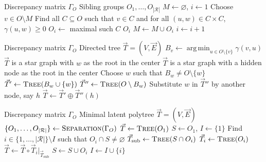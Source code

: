 \documentclass[11pt,a4paper]{article}
\numberwithin{equation}{section}
\DeclareMathOperator{\argmin}{arg\,min}
\begin{document}
\begin{algorithm}[H]
\caption{Separation($\Gamma_O$)}
\label{alg:separation}
\begin{algorithmic}[1]
    \Require Discrepancy matrix $\Gamma_O$
    \Ensure Sibling groups $O_1, \ldots, O_{|\mathcal{R}|}$
    \State $M \leftarrow \varnothing$, $i \leftarrow 1$
        \State Choose $v \in O \setminus M$
        \State Find all $C \subseteq O$ such that $v \in C$ and 
        \Statex \hspace{\algorithmicindent} for all $(u,w) \in C \times C$, $\gamma(u,w) \ge 0$
        \State $O_i \leftarrow$ maximal such $C$
        \State \Return $O_i$
        \State $M \leftarrow M \cup O_i$
        \State $i \leftarrow i + 1$
    \EndWhile
\end{algorithmic}
\end{algorithm}

\begin{algorithm}[H]
\caption{Tree($\Gamma_O$)}
\label{alg:tree} 
\begin{algorithmic}[1]
    \Require Discrepancy matrix $\Gamma_O$
    \Ensure Directed tree $\vec{T} = (V, \vec{E})$
        \State $B_v \leftarrow \argmin_{u \in O \setminus \{v\}} \gamma(v,u)$
    \EndFor
            \State $\vec{T}$ is a star graph with $w$ as the root in the center
        \Else
            \State $\vec{T}$ is a star graph with a hidden node as the root in the center
        \EndIf
    \Else
        \State Choose $w$ such that $B_w \ne O \setminus \{w\}$
        \State $\vec{T}' \leftarrow \textsc{Tree}(B_w \cup \{w\})$
        \State $\vec{T}'' \leftarrow \textsc{Tree}(O \setminus B_w)$
        \State Substitute $w$ in $\vec{T}''$ by another node, say $h$
        \State $\vec{T} \leftarrow \vec{T}' \oplus \vec{T}''(h)$
    \EndIf
\end{algorithmic}
\end{algorithm}

\begin{algorithm}[H]
\caption{Polytree($\Gamma_O$)}
\label{alg:polytree}
\begin{algorithmic}[1]
    \Require Discrepancy matrix $\Gamma_O$
    \Ensure Minimal latent polytree $\vec{T} = (V, \vec{E})$
    \State $\{O_1, \ldots, O_{|\mathcal{R}|}\} \leftarrow \textsc{Separation}(\Gamma_O)$
    \State $\vec{T} \leftarrow \textsc{Tree}(O_1)$
    \State $S \leftarrow O_1$, \quad $I \leftarrow \{1\}$
        \State Find $i \in \{1,\ldots,|\mathcal{R}|\} \setminus I$ such that $O_i \cap S \ne \varnothing$
        \State $\vec{T}_{\text{sub}} \leftarrow \textsc{Tree}(S \cap O_i)$
        \State $\vec{T}_i \leftarrow \textsc{Tree}(O_i)$
        \State $\vec{T} \leftarrow \vec{T} \circ \vec{T}_i \vert_{\vec{T}_{\text{sub}}}$
        \State $S \leftarrow S \cup O_i$
        \State $I \leftarrow I \cup \{i\}$
    \EndWhile
\end{algorithmic}
\end{algorithm}
\end{document}
